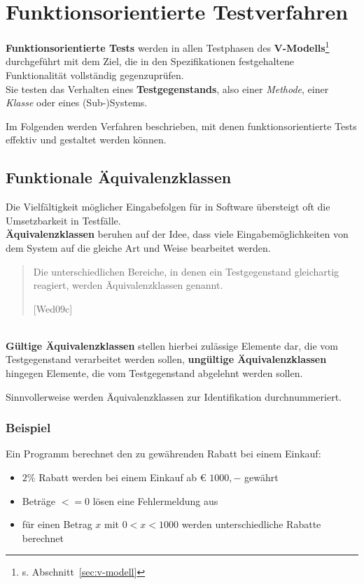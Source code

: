 \section{Funktionsorientierte Testverfahren}

\begin{tcolorbox}
    \textbf{Funktionsorientierte Tests} werden in allen Testphasen des \textbf{V-Modells}\footnote{s. Abschnitt~\ref{sec:v-modell}} durchgeführt mit dem Ziel, die in den Spezifikationen festgehaltene  Funktionalität vollständig gegenzuprüfen.\\
    Sie testen das Verhalten eines \textbf{Testgegenstands}, also einer \textit{Methode}, einer \textit{Klasse} oder eines (Sub-)Systems.
\end{tcolorbox}
\vspace{2mm}

\noindent
Im Folgenden werden Verfahren beschrieben, mit denen funktionsorientierte Tests effektiv und gestaltet werden können.

\subsection{Funktionale Äquivalenzklassen}
Die Vielfältigkeit möglicher Eingabefolgen für in Software übersteigt oft die Umsetzbarkeit in Testfälle.\\
\textbf{Äquivalenzklassen} beruhen auf der Idee, dass viele Eingabemöglichkeiten von dem System auf die gleiche Art und Weise bearbeitet werden.

\begin{tcolorbox}[title=Äquivalenzklassen]
    \blockquote[{\cite{43}[Wed09c]}]{
    Die unterschiedlichen Bereiche, in denen ein Testgegenstand gleichartig reagiert, werden Äquivalenzklassen genannt.
    }\\
    \textbf{Gültige Äquivalenzklassen} stellen hierbei zulässige Elemente dar, die vom Testgegenstand verarbeitet werden sollen, \textbf{ungültige Äquivalenzklassen} hingegen Elemente, die vom Testgegenstand abgelehnt werden sollen.
\end{tcolorbox}

\noindent
Sinnvollerweise werden Äquivalenzklassen zur Identifikation durchnummeriert.

\subsubsection*{Beispiel}
Ein Programm berechnet den zu gewährenden Rabatt bei einem Einkauf:
\begin{itemize}
    \item $2\%$ Rabatt werden bei einem Einkauf ab € $1000,-$ gewährt
    \item Beträge $<= 0$ lösen eine Fehlermeldung aus
    \item für einen Betrag $x$ mit $0 < x < 1000$ werden unterschiedliche Rabatte berechnet
\end{itemize}

